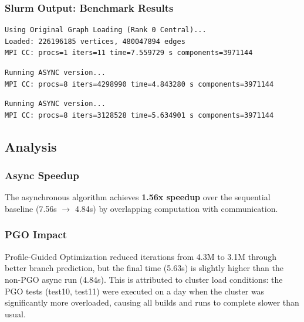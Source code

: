 \documentclass[11pt,a4paper]{article}
\begin{document}
\subsubsection{Slurm Output: Benchmark Results}

\begin{lstlisting}[caption={Sequential Run (test5)}]
Using Original Graph Loading (Rank 0 Central)...
Loaded: 226196185 vertices, 480047894 edges
MPI CC: procs=1 iters=11 time=7.559729 s components=3971144
\end{lstlisting}

\begin{lstlisting}[caption={Async Distributed Run (test9)}]
Running ASYNC version...
MPI CC: procs=8 iters=4298990 time=4.843280 s components=3971144
\end{lstlisting}

\begin{lstlisting}[caption={Async + PGO Run (test11)}]
Running ASYNC version...
MPI CC: procs=8 iters=3128528 time=5.634901 s components=3971144
\end{lstlisting}

\subsection{Analysis}

\subsubsection{Async Speedup}
The asynchronous algorithm achieves \textbf{1.56x speedup} over the sequential baseline (7.56s $\rightarrow$ 4.84s) by overlapping computation with communication.

\subsubsection{PGO Impact}
Profile-Guided Optimization reduced iterations from 4.3M to 3.1M through better branch prediction, but the final time (5.63s) is slightly higher than the non-PGO async run (4.84s). This is attributed to cluster load conditions: the PGO tests (test10, test11) were executed on a day when the cluster was significantly more overloaded, causing all builds and runs to complete slower than usual.

\end{document}
